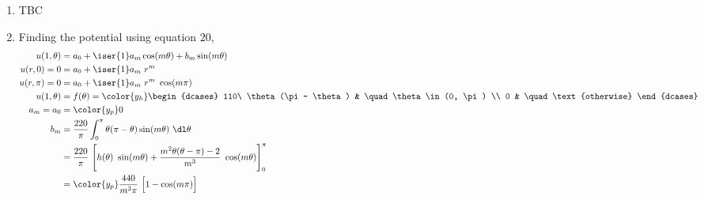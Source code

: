 \begin{enumerate}
    \item TBC

    \item Finding the potential using equation $ 20 $,
          \begin{align}
              u(1, \theta)  & = a_0 + \iser{1} a_m \cos(m\theta) + b_m \sin(m\theta) \\
              u(r, 0) = 0   & = a_0 + \iser{1} a_m\ r^m                              \\
              u(r, \pi) = 0 & = a_0 + \iser{1} a_m\ r^m\ \cos(m\pi)                  \\
              u(1, \theta)  & = f(\theta) = \color{y_h}
              \begin{dcases}
                  110\ \theta(\pi - \theta) & \quad \theta \in (0, \pi) \\
                  0                         & \quad \text{otherwise}
              \end{dcases}                  \\
              a_m = a_0     & = \color{y_p} 0                                        \\
              b_m           & = \frac{220}{\pi} \int_{0}^{\pi} \theta(\pi - \theta)
              \sin(m\theta) \ \dl \theta                                             \\
                            & = \frac{220}{\pi}\ \Bigg[ h(\theta)\ \sin(m\theta) +
              \frac{m^2\theta(\theta - \pi)- 2}{m^3}\ \cos(m\theta) \Bigg]_{0}^{\pi} \\
                            & = \color{y_p} \frac{440}{m^3\pi}\ \Big[
                  1 - \cos(m\pi) \Big]
          \end{align}


\end{enumerate}

